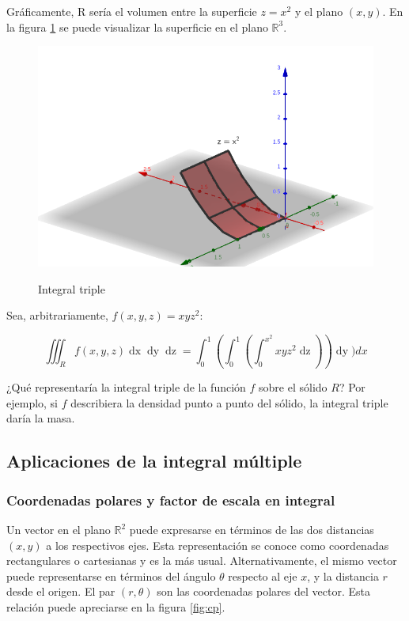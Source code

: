 \documentclass{article}
\renewcommand{\Bbb}{\mathbb}
\begin{document}
Gráficamente, R sería el volumen entre la superficie $z = x^2$ y el plano $(x, y)$. En la figura \ref{fig:itv} se puede visualizar la superficie en el plano $\Bbb R^3$.

\begin{figure}[ht]
\centering
\caption{Integral triple}
\includegraphics[scale=0.6]{img/integrales/itv.png}
\label{fig:itv}
\end{figure}

Sea, arbitrariamente, $f(x,y,z) = xyz^2$:

\begin{equation}
\iiint_R f(x,y,z) \mathop{dx} \mathop{dy} \mathop{dz} = \int_0^1 \left( \int_0^1 \left( \int_0^{x^2} xyz^2 \mathop{dz} \right)  \right) \mathop{dy}) dx
\end{equation}

¿Qué representaría la integral triple de la función $f$ sobre el sólido $R$? Por ejemplo, si $f$ describiera la densidad punto a punto del sólido, la integral triple daría la masa.

\subsection{Aplicaciones de la integral múltiple}

\subsubsection{Coordenadas polares y factor de escala en integral}

Un vector en el plano $\Bbb R^2$ puede expresarse en términos de las dos distancias $(x,y)$ a los respectivos ejes. Esta representación se conoce como coordenadas rectangulares o cartesianas y es la más usual. Alternativamente, el mismo vector puede representarse en términos del ángulo $\theta$ respecto al eje $x$, y la distancia $r$ desde el origen. El par $(r, \theta)$ son las coordenadas polares del vector. Esta relación puede apreciarse en la figura \ref{fig:cp}.
\end{document}
